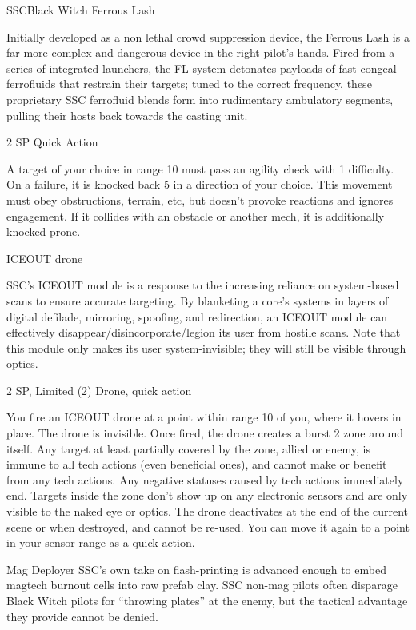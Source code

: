 \begin{mech}{SSC}{Black Witch}
Ferrous Lash

Initially developed as a non lethal crowd suppression device, the Ferrous Lash is a far more complex and dangerous device in the right pilot's hands. Fired from a series of integrated launchers, the FL system detonates payloads of fast-congeal ferrofluids that restrain their targets; tuned to the correct frequency, these proprietary SSC ferrofluid blends form into rudimentary ambulatory segments, pulling their hosts back towards the casting unit.

2 SP
Quick Action

A target of your choice in range 10 must pass an agility check with 1 difficulty. On a failure, it is knocked back 5 in a direction of your choice. This movement must obey obstructions, terrain, etc, but doesn't provoke reactions and ignores engagement. If it collides with an obstacle or another mech, it is additionally knocked prone.


ICEOUT drone

SSC's ICEOUT module is a response to the increasing reliance on system-based scans to ensure accurate targeting. By blanketing a core's systems in layers of digital defilade, mirroring, spoofing, and redirection, an ICEOUT module can effectively disappear/disincorporate/legion its user from hostile scans. Note that this module only makes its user system-invisible; they will still be visible through optics.

2 SP, Limited (2)
Drone, quick action

You fire an ICEOUT drone at a point within range 10 of you, where it hovers in place. The drone is invisible. Once fired, the drone creates a burst 2 zone around itself. Any target at least partially covered by the zone, allied or enemy, is immune to all tech actions (even beneficial ones), and cannot make or benefit from any tech actions. Any negative statuses caused by tech actions immediately end. Targets inside the zone don't show up on any electronic sensors and are only visible to the naked eye or optics. The drone deactivates at the end of the current scene or when destroyed, and cannot be re-used. You can move it again to a point in your sensor range as a quick action.


Mag Deployer
SSC's own take on flash-printing is advanced enough to embed magtech burnout cells into raw prefab clay. SSC non-mag pilots often disparage Black Witch pilots for ``throwing plates'' at the enemy, but the tactical advantage they provide cannot be denied.


\end{mech}
